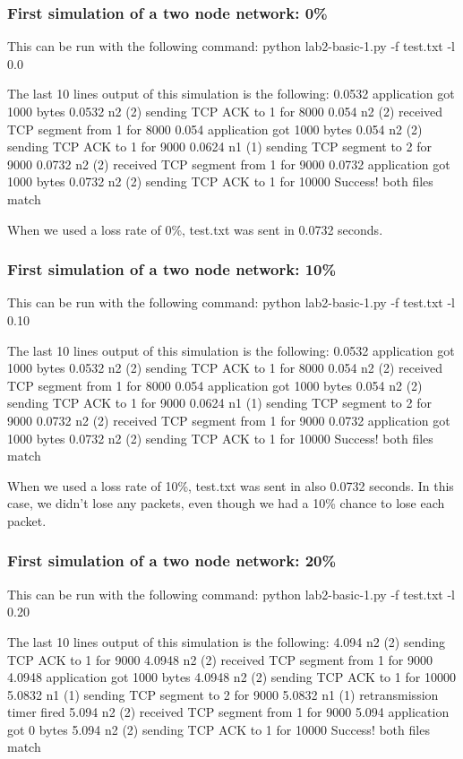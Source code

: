 \documentclass[fleqn,11pt]{article}
\begin{document}
\subsubsection{First simulation of a two node network: 0\%}
This can be run with the following command: python lab2-basic-1.py -f test.txt -l 0.0

The last 10 lines output of this simulation is the following:
0.0532 application got 1000 bytes
0.0532 n2 (2) sending TCP ACK to 1 for 8000
0.054 n2 (2) received TCP segment from 1 for 8000
0.054 application got 1000 bytes
0.054 n2 (2) sending TCP ACK to 1 for 9000
0.0624 n1 (1) sending TCP segment to 2 for 9000
0.0732 n2 (2) received TCP segment from 1 for 9000
0.0732 application got 1000 bytes
0.0732 n2 (2) sending TCP ACK to 1 for 10000
Success! both files match

When we used a loss rate of 0\%, test.txt was sent in 0.0732 seconds.

\subsubsection{First simulation of a two node network: 10\%}
This can be run with the following command: python lab2-basic-1.py -f test.txt -l 0.10

The last 10 lines output of this simulation is the following:
0.0532 application got 1000 bytes
0.0532 n2 (2) sending TCP ACK to 1 for 8000
0.054 n2 (2) received TCP segment from 1 for 8000
0.054 application got 1000 bytes
0.054 n2 (2) sending TCP ACK to 1 for 9000
0.0624 n1 (1) sending TCP segment to 2 for 9000
0.0732 n2 (2) received TCP segment from 1 for 9000
0.0732 application got 1000 bytes
0.0732 n2 (2) sending TCP ACK to 1 for 10000
Success! both files match

When we used a loss rate of 10\%, test.txt was sent in also 0.0732 seconds. In this case, we didn't lose any packets, even though we had a 10\% chance to lose each packet.

\subsubsection{First simulation of a two node network: 20\%}
This can be run with the following command: python lab2-basic-1.py -f test.txt -l 0.20

The last 10 lines output of this simulation is the following:
4.094 n2 (2) sending TCP ACK to 1 for 9000
4.0948 n2 (2) received TCP segment from 1 for 9000
4.0948 application got 1000 bytes
4.0948 n2 (2) sending TCP ACK to 1 for 10000
5.0832 n1 (1) sending TCP segment to 2 for 9000
5.0832 n1 (1) retransmission timer fired
5.094 n2 (2) received TCP segment from 1 for 9000
5.094 application got 0 bytes
5.094 n2 (2) sending TCP ACK to 1 for 10000
Success! both files match
\end{document}
